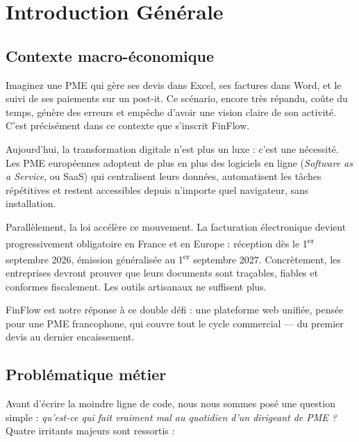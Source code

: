 \documentclass[12pt,a4paper]{report}
\begin{document}
\cleardoublepage

\chapter{Introduction Générale}

\section{Contexte macro-économique}

Imaginez une PME qui gère ses devis dans Excel, ses factures dans Word, et le suivi de ses paiements sur un post-it. Ce scénario, encore très répandu, coûte du temps, génère des erreurs et empêche d'avoir une vision claire de son activité. C'est précisément dans ce contexte que s'inscrit FinFlow.

Aujourd'hui, la transformation digitale n'est plus un luxe : c'est une nécessité. Les PME européennes adoptent de plus en plus des logiciels en ligne (\textit{Software as a Service}, ou SaaS) qui centralisent leurs données, automatisent les tâches répétitives et restent accessibles depuis n'importe quel navigateur, sans installation.

Parallèlement, la loi accélère ce mouvement. La facturation électronique devient progressivement obligatoire en France et en Europe : réception dès le 1\textsuperscript{er} septembre 2026, émission généralisée au 1\textsuperscript{er} septembre 2027. Concrètement, les entreprises devront prouver que leurs documents sont traçables, fiables et conformes fiscalement. Les outils artisanaux ne suffisent plus.

FinFlow est notre réponse à ce double défi : une plateforme web unifiée, pensée pour une PME francophone, qui couvre tout le cycle commercial --- du premier devis au dernier encaissement.

\section{Problématique métier}

Avant d'écrire la moindre ligne de code, nous nous sommes posé une question simple : \emph{qu'est-ce qui fait vraiment mal au quotidien d'un dirigeant de PME ?} Quatre irritants majeurs sont ressortis :
\end{document}

